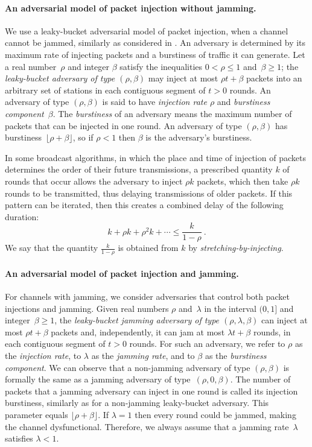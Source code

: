 \documentclass[11pt]{article}
\newcommand{\BBB}{\vspace*{-\bigskipamount}}
\newcommand{\Paragraph}[1]{\BBB\paragraph{#1}}
\begin{document}

\Paragraph{An adversarial model of packet injection without jamming.}



We use a leaky-bucket adversarial model of packet injection, when a channel cannot be jammed, similarly as considered in \cite{AndrewsAFLLK01, ChlebusKR09}.
An adversary is determined by its maximum rate of injecting packets and a burstiness of traffic it can generate. 
Let a real number~$\rho$  and integer $\beta$ satisfy the inequalities $0<\rho\le 1$ and~$\beta\ge 1$; 
the \emph{leaky-bucket adversary of type $(\rho,\beta)$} may inject at most $\rho t+\beta$ packets into an arbitrary set of stations in each contiguous segment of $t>0$ rounds.
An adversary of type $(\rho,\beta)$ is said to have \emph{injection rate $\rho$} and \emph{burstiness component}~$\beta$.
The \emph{burstiness} of an adversary means the maximum number of packets that can be injected  in one round.
An adversary of type $(\rho,\beta)$ has burstiness~$\lfloor\rho+\beta\rfloor$, so if $\rho<1$ then $\beta$ is the adversary's burstiness.

In some broadcast algorithms, in which the place and time of injection of packets determines the order of their future transmissions, a prescribed quantity $k$ of rounds that occur allows the adversary to inject $\rho k$ packets, which then take $\rho k$ rounds to be transmitted, thus delaying transmissions of older packets.
If this pattern can be iterated, then this creates a combined delay of the following duration:
\[
k + \rho k + \rho^2 k+\cdots \le \frac{k}{1-\rho}
\ .
\]
We say that the quantity $\frac{k}{1-\rho}$ is obtained from $k$ by \emph{stretching-by-injecting}.







\Paragraph{An adversarial model of packet injection and jamming.}




For channels with jamming, we consider adversaries that control both packet injections and jamming.
Given real numbers $\rho$ and~$\lambda$ in the interval $(0,1]$ and integer~$\beta\ge 1$, the \emph{leaky-bucket jamming adversary of type $(\rho,\lambda,\beta)$} can inject at most $\rho t + \beta$ packets and, independently, it can jam at most $\lambda t + \beta$ rounds, in each contiguous segment of $t>0$ rounds.
For such an adversary, we refer to $\rho$ as the \emph{injection rate}, to $\lambda$ as the \emph{jamming rate}, and to $\beta$ as the \emph{burstiness component}. 
We can observe that a non-jamming adversary of type $(\rho,\beta)$ is formally the same as a  jamming adversary of type~$(\rho,0,\beta)$.
The number of packets that a jamming adversary can inject in one round is called its injection burstiness, similarly as for a non-jamming leaky-bucket adversary.
This parameter equals $\lfloor \rho + \beta\rfloor$.
If $\lambda= 1$ then every round could be jammed, making the channel dysfunctional.
Therefore, we always assume that a jamming rate~$\lambda$ satisfies $\lambda< 1$.
\end{document}
